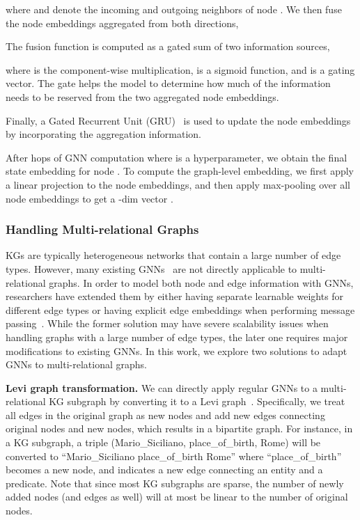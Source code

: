 \documentclass[journal]{IEEEtran}
\begin{document}
where  and  denote the incoming and outgoing neighbors of node . 
We then fuse the node embeddings aggregated from both directions,


The fusion function is computed as a gated sum of two information sources,

where  is the component-wise multiplication,  is a sigmoid function, and  is a gating vector.
The gate helps the model to determine how much of the information needs to be reserved from the two aggregated node embeddings.




Finally, a Gated Recurrent Unit (GRU)~\cite{cho2014learning} is used to update the node embeddings by incorporating the aggregation information.

After  hops of GNN computation where  is a hyperparameter,
we obtain the final state embedding  for node .
To compute the graph-level embedding, we first apply a linear projection to the node embeddings, and then apply max-pooling over all node embeddings to get a -dim vector .




\subsubsection{Handling Multi-relational Graphs}


KGs are typically heterogeneous networks that contain a large number of edge types.
However, many existing GNNs~\cite{kipf2016semi,hamilton2017inductive,li2015gated,velivckovic2017graph} are not directly applicable to multi-relational graphs.
In order to model both node and edge information with GNNs,
researchers have extended them by either having separate learnable weights for different edge types or having explicit edge embeddings when performing message passing~\cite{gilmer2017neural,simonovsky2017dynamic}.
While the former solution may have severe scalability issues when handling graphs with a large number of edge types, 
the later one requires major modifications to existing GNNs.
In this work, we explore two solutions to adapt GNNs to multi-relational graphs.

\smallskip
\noindent\textbf{Levi graph transformation.} 
We can directly apply regular GNNs to a multi-relational KG subgraph
by converting it to a Levi graph~\cite{levi1942finite}.
Specifically, we treat all edges in the original graph as new nodes and add new edges connecting original nodes and new nodes, which results in a bipartite graph.
For instance, in a KG subgraph, a triple (Mario\_Siciliano, place\_of\_birth, Rome)
will be converted to ``Mario\_Siciliano  place\_of\_birth  Rome'' where ``place\_of\_birth'' becomes a new node, and  indicates a new edge connecting an entity and a predicate.
Note that since most KG subgraphs are sparse, the number of newly added nodes (and edges as well) will at most be linear to the number of original nodes.
\end{document}
